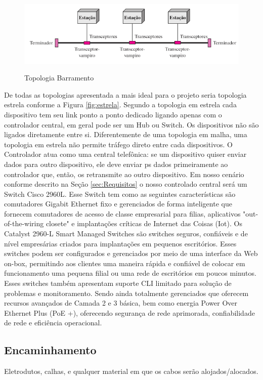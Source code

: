 \documentclass[	DIV=calc,%
							paper=a4,%
							fontsize=12pt,%
							onecolumn]{scrartcl}	 					%
\begin{document}
\begin{figure}[!htbp]
	\centering
	\includegraphics[width=\textwidth]{./imagens/barramento.png}
	\caption{Topologia Barramento}
	\cite{forouzan2007}
	\label{fig:barramento}
\end{figure}

De todas as topologias apresentada a mais ideal para o projeto seria topologia estrela conforme a Figura \ref{fig:estrela}. Segundo \cite{forouzan2007} a topologia em estrela cada dispositivo tem seu link ponto a ponto dedicado ligando apenas com o controlador central, em geral pode ser um Hub ou Switch. Os dispositivos não são ligados diretamente entre si. Diferentemente de uma topologia em malha, uma topologia em estrela não permite tráfego direto entre cada dispositivos. O Controlador atua como uma central telefônica: se um dispositivo quiser enviar dados para outro dispositivo, ele deve enviar ps dados primeiramente ao controlador que, então, os retransmite ao outro dispositivo. Em nosso cenário conforme descrito na Seção \ref{sec:Requisitos} o nosso controlado central será um Switch Cisco 2960L.
Esse Switch tem como as seguintes características são comutadores Gigabit Ethernet fixo e gerenciados de forma inteligente que fornecem comutadores de acesso de classe empresarial para filias, aplicativos "out-of-the-wiring closete" e implantações críticas de Internet das Coisas (Iot). Os Catalyst 2960-L Smart Managed Switches são switches seguros, confiáveis e de nível empresárias criados para implantações em pequenos escritórios. Esses switches podem ser configurados e gerenciados por meio de uma interface da Web on-box, permitindo aos clientes uma maneira rápida e confiável de colocar em funcionamento uma pequena filial ou uma rede de escritórios em poucos minutos. Esses switches também apresentam suporte CLI limitado para solução de problemas e monitoramento. Sendo ainda totalmente gerenciados que oferecem recursos avançados de Camada 2 e 3 básica, bem como energia Power Over Ethernet Plus (PoE +), oferecendo segurança de rede aprimorada, confiabilidade de rede e eficiência operacional. 
 	
\subsection{Encaminhamento}
Eletrodutos, calhas, e qualquer material em que os cabos serão alojados/alocados.
\end{document}
